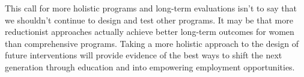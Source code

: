 \documentclass[11pt]{article}
\begin{document}
This call for more holistic programs and long-term evaluations isn't to say that we shouldn't continue to design and test other programs. It may be that more reductionist approaches actually achieve better long-term outcomes for women than comprehensive programs. Taking a more holistic approach to the design of future interventions will provide evidence of the best ways to shift the next generation through education and into empowering employment opportunities. 


\end{document}
